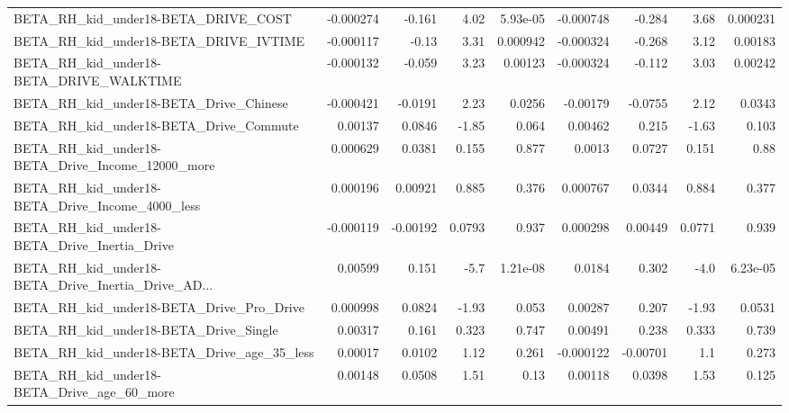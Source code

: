 \begin{tabular}{lrrrrrrrr}
BETA\_RH\_kid\_under18-BETA\_DRIVE\_COST                &   -0.000274 &       -0.161 &     4.02 & 5.93e-05 &  -0.000748 &      -0.284 &         3.68 &      0.000231 \\
BETA\_RH\_kid\_under18-BETA\_DRIVE\_IVTIME              &   -0.000117 &        -0.13 &     3.31 & 0.000942 &  -0.000324 &      -0.268 &         3.12 &       0.00183 \\
BETA\_RH\_kid\_under18-BETA\_DRIVE\_WALKTIME            &   -0.000132 &       -0.059 &     3.23 &  0.00123 &  -0.000324 &      -0.112 &         3.03 &       0.00242 \\
BETA\_RH\_kid\_under18-BETA\_Drive\_Chinese             &   -0.000421 &      -0.0191 &     2.23 &   0.0256 &   -0.00179 &     -0.0755 &         2.12 &        0.0343 \\
BETA\_RH\_kid\_under18-BETA\_Drive\_Commute             &     0.00137 &       0.0846 &    -1.85 &    0.064 &    0.00462 &       0.215 &        -1.63 &         0.103 \\
BETA\_RH\_kid\_under18-BETA\_Drive\_Income\_12000\_more   &    0.000629 &       0.0381 &    0.155 &    0.877 &     0.0013 &      0.0727 &        0.151 &          0.88 \\
BETA\_RH\_kid\_under18-BETA\_Drive\_Income\_4000\_less    &    0.000196 &      0.00921 &    0.885 &    0.376 &   0.000767 &      0.0344 &        0.884 &         0.377 \\
BETA\_RH\_kid\_under18-BETA\_Drive\_Inertia\_Drive       &   -0.000119 &     -0.00192 &   0.0793 &    0.937 &   0.000298 &     0.00449 &       0.0771 &         0.939 \\
BETA\_RH\_kid\_under18-BETA\_Drive\_Inertia\_Drive\_AD... &     0.00599 &        0.151 &     -5.7 & 1.21e-08 &     0.0184 &       0.302 &         -4.0 &      6.23e-05 \\
BETA\_RH\_kid\_under18-BETA\_Drive\_Pro\_Drive           &    0.000998 &       0.0824 &    -1.93 &    0.053 &    0.00287 &       0.207 &        -1.93 &        0.0531 \\
BETA\_RH\_kid\_under18-BETA\_Drive\_Single              &     0.00317 &        0.161 &    0.323 &    0.747 &    0.00491 &       0.238 &        0.333 &         0.739 \\
BETA\_RH\_kid\_under18-BETA\_Drive\_age\_35\_less         &     0.00017 &       0.0102 &     1.12 &    0.261 &  -0.000122 &    -0.00701 &          1.1 &         0.273 \\
BETA\_RH\_kid\_under18-BETA\_Drive\_age\_60\_more         &     0.00148 &       0.0508 &     1.51 &     0.13 &    0.00118 &      0.0398 &         1.53 &         0.125 \\

\end{tabular}
